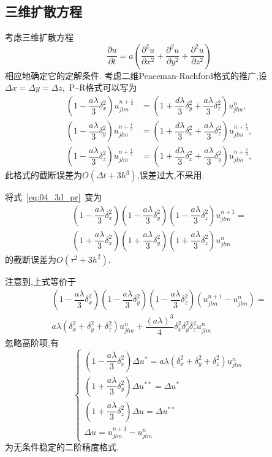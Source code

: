 \subsection{三维扩散方程}
考虑三维扩散方程
\begin{equation}
\dfrac{\partial u}{\partial t}=a\left(\dfrac{\partial^2 u}{\partial x^2}+
\dfrac{\partial^2 u}{\partial y^2}+\dfrac{\partial^2 u}{\partial z^2}\right)
\end{equation}
相应地确定它的定解条件.
考虑二维Peaceman-Rachford格式的推广,设$\Delta x=\Delta y=\Delta z$,~P--R格式可以写为
\begin{equation}\label{eq:04_3d_pr}
\begin{split}
\left(1-\dfrac{a\lambda}{3}\delta_x^2\right)u_{jlm}^{n+\frac{1}{3}} &= 
\left(1+\dfrac{d\lambda}{3}\delta_y^2+\dfrac{a\lambda}{3}\delta_z^2\right)u_{jlm}^n, \\
\left(1-\dfrac{a\lambda}{3}\delta_y^2\right)u_{jlm}^{n+\frac{1}{3}} &= 
\left(1+\dfrac{d\lambda}{3}\delta_x^2+\dfrac{a\lambda}{3}\delta_z^2\right)u_{jlm}^{n+\frac{1}{3}}, \\
\left(1-\dfrac{a\lambda}{3}\delta_z^2\right)u_{jlm}^{n+\frac{1}{3}} &= 
\left(1+\dfrac{d\lambda}{3}\delta_x^2+\dfrac{a\lambda}{3}\delta_y^2\right)u_{jlm}^{n+\frac{2}{3}},
\end{split}
\end{equation}
此格式的截断误差为$O(\Delta t+3h^3)$,误差过大,不采用.\par
将式~\eqref{eq:04_3d_pr}~变为
\begin{multline}
\left(1-\dfrac{a\lambda}{3}\delta_x^2\right)\left(1-\dfrac{a\lambda}{3}\delta_y^2\right)\left(1-\dfrac{a\lambda}{3}\delta_z^2\right)
u_{jlm}^{n+1}=\\
\left(1+\dfrac{a\lambda}{3}\delta_x^2\right)
\left(1+\dfrac{a\lambda}{3}\delta_y^2\right)
\left(1+\dfrac{a\lambda}{3}\delta_z^2\right)
u_{jlm}^n
\end{multline}
的截断误差为$O(\tau^2+3h^2)$.\par
注意到,上式等价于
\begin{multline}
\left(1-\dfrac{a\lambda}{3}\delta_x^2\right)\left(1-\dfrac{a\lambda}{3}\delta_y^2\right)\left(1-\dfrac{a\lambda}{3}\delta_z^2\right)
(u_{jlm}^{n+1}-u_{jlm}^n)=\\
a\lambda(\delta_x^2+\delta_y^2+\delta_z^2)u_{jlm}^n+\dfrac{(a\lambda)^3}{4}\delta_x^2\delta_y^2\delta_z^2
u_{jlm}^n
\end{multline}
忽略高阶项,有
\begin{equation}
\begin{cases}
\left(1-\dfrac{a\lambda}{3}\delta_x^2\right)\Delta u^*=a\lambda(\delta_x^2+\delta_y^2+\delta_z^2)u_{jlm}^n \\[15pt]
\left(1+\dfrac{a\lambda}{3}\delta_y^2\right)\Delta u^{**} = \Delta u^* \\[15pt]
\left(1+\dfrac{a\lambda}{3}\delta_z^2\right)\Delta u = \Delta u^{**} \\[15pt]
\Delta u = u_{jlm}^{n+1}-u_{jlm}^n
\end{cases}
\end{equation}
为无条件稳定的二阶精度格式.
